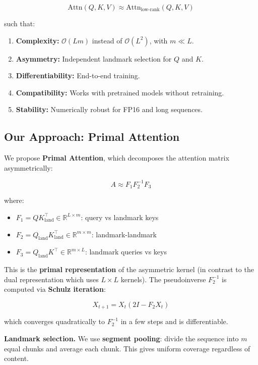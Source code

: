 \[
\text{Attn}(Q, K, V) \approx \text{Attn}_\text{low-rank}(Q, K, V)
\]

such that:

\begin{enumerate}
\item \textbf{Complexity:} $\mathcal{O}(L m)$ instead of $\mathcal{O}(L^2)$, with $m \ll L$.
\item \textbf{Asymmetry:} Independent landmark selection for $Q$ and $K$.
\item \textbf{Differentiability:} End-to-end training.
\item \textbf{Compatibility:} Works with pretrained models without retraining.
\item \textbf{Stability:} Numerically robust for FP16 and long sequences.

\end{enumerate}
\subsection{Our Approach: Primal Attention}

We propose \textbf{Primal Attention}, which decomposes the attention matrix 
asymmetrically:

\[
A \approx F_1 F_2^{-1} F_3
\]

where:

\begin{itemize}
\item $F_1 = Q K_\text{land}^\top \in \mathbb{R}^{L \times m}$: query vs landmark keys
\item $F_2 = Q_\text{land} K_\text{land}^\top \in \mathbb{R}^{m \times m}$: landmark-landmark
\item $F_3 = Q_\text{land} K^\top \in \mathbb{R}^{m \times L}$: landmark queries vs keys

\end{itemize}
This is the \textbf{primal representation} of the asymmetric kernel (in contrast 
to the dual representation which uses $L \times L$ kernels). The pseudoinverse 
$F_2^{-1}$ is computed via \textbf{Schulz iteration}:

\[
X_{t+1} = X_t (2I - F_2 X_t)
\]

which converges quadratically to $F_2^{-1}$ in a few steps and is differentiable.

\textbf{Landmark selection.} We use \textbf{segment pooling}: divide the sequence into 
$m$ equal chunks and average each chunk. This gives uniform coverage 
regardless of content.

